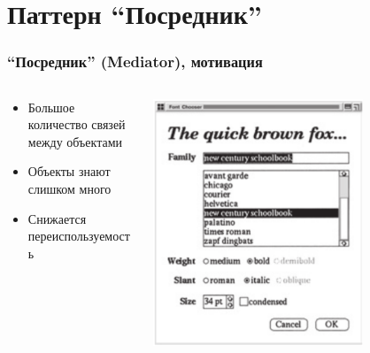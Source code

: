 \documentclass{../../slides-style}
\begin{document}
    \section{Паттерн ``Посредник''}

    \begin{frame}
        \frametitle{``Посредник'' (Mediator), мотивация}
        \begin{columns}
            \begin{column}{0.6\textwidth}
                \begin{itemize}
                    \item Большое количество связей между объектами
                    \item Объекты знают слишком много
                    \item Снижается переиспользуемость
                \end{itemize}
            \end{column}
            \begin{column}{0.4\textwidth}
                \begin{center}
                    \includegraphics[width=0.7\textwidth]{mediatorMotivation.png}
                \end{center}
            \end{column}
        \end{columns}
    \end{frame}
\end{document}
